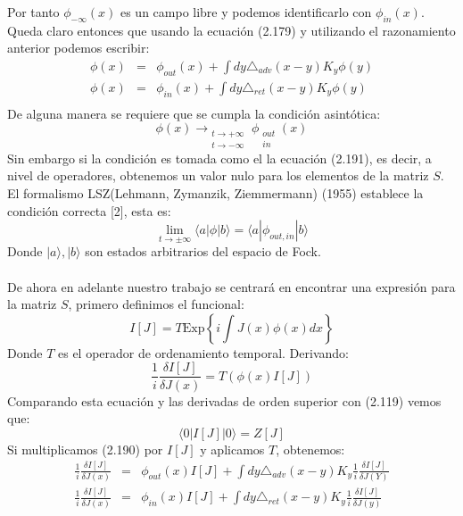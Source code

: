 Por tanto $\phi_{-\infty}(x)$ es un campo libre y podemos identificarlo con $\phi_{in}(x)$. Queda claro entonces que usando la ecuación (2.179) y utilizando el razonamiento anterior podemos escribir:
\begin{eqnarray}
\nonumber \phi(x)&=&\phi_{out}(x)+\int dy\triangle_{adv}(x-y)K_{y}\phi(y)\\
\nonumber \phi(x)&=&\phi_{in}(x)+\int dy\triangle_{ret}(x-y)K_{y}\phi(y)\\
\end{eqnarray}
De alguna manera se requiere que se cumpla la condición asintótica:
\begin{equation}
 \phi(x)\longrightarrow_{\begin{array}{c}
t\to+\infty\\
t\to-\infty
\end{array}}\phi_{\begin{array}{c}
out\\
in
\end{array}}(x)	
\end{equation} 
Sin embargo si la condición es tomada como el la ecuación (2.191), es decir, a nivel de operadores, obtenemos un valor nulo para los elementos de la matriz $S$. El formalismo LSZ(Lehmann, Zymanzik, Ziemmermann) (1955) establece la condición correcta [2], esta es:
\begin{equation}
\lim_{t\to\pm\infty}\langle a|\phi|b\rangle=\langle a|\phi_{out,in}|b\rangle
\end{equation}
Donde $|a\rangle,|b\rangle$ son estados arbitrarios del espacio de Fock.
\\
\\
De ahora en adelante nuestro trabajo se centrará en encontrar una expresión para la matriz $S$, primero definimos el funcional:
\begin{equation}
I[J]=T\text{Exp}\left\{ i\int J(x)\phi(x)dx\right\} 
\end{equation}
Donde $T$ es el operador de ordenamiento temporal. Derivando:
\begin{equation}
\frac{1}{i}\frac{\delta I[J]}{\delta J(x)}=T(\phi(x)I[J])
\end{equation} 
Comparando esta ecuación y las derivadas de orden superior con (2.119) vemos que:
\begin{equation}
\langle 0|I[J]|0\rangle=Z[J]
\end{equation}
Si multiplicamos (2.190) por $I[J]$ y aplicamos $T$, obtenemos:
\begin{eqnarray}
\nonumber \frac{1}{i}\frac{\delta I[J]}{\delta J(x)}&=&\phi_{out}(x)I[J]+\int dy\triangle_{adv}(x-y)K_{y}\frac{1}{i}\frac{\delta I[J]}{\delta J(Y)}\\
\nonumber \frac{1}{i}\frac{\delta I[J]}{\delta J(x)}&=&\phi_{in}(x)I[J]+\int dy\triangle_{ret}(x-y)K_{y}\frac{1}{i}\frac{\delta I[J]}{\delta J(y)}\\
\end{eqnarray}
